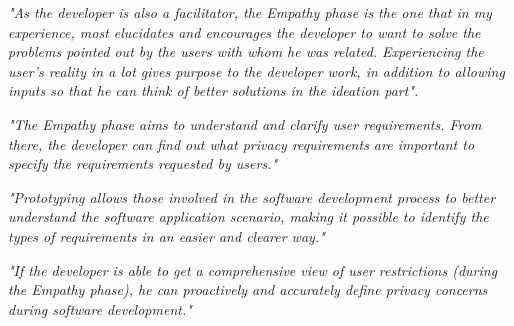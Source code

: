 \documentclass[conference]{IEEEtran}
\begin{document}
\begin{mq}
\emph{"As the developer is also a facilitator, the Empathy phase is the one that in my experience, most elucidates and encourages the developer to want to solve the problems pointed out by the users with whom he was related. Experiencing the user's reality in a lot gives purpose to the developer work, in addition to allowing inputs so that he can think of better solutions in the ideation part".}
\end{mq}

\begin{mq}
\emph{"The Empathy phase aims to understand and clarify user requirements. From there, the developer can find out what privacy requirements are important to specify the requirements requested by users."}
\end{mq}

\begin{mq}
\emph{"Prototyping allows those involved in the software development process to better understand the software application scenario, making it possible to identify the types of requirements in an easier and clearer way."}
\end{mq}

\begin{mq}
\emph{"If the developer is able to get a comprehensive view of user restrictions (during the Empathy phase), he can proactively and accurately define privacy concerns during software development."}
\end{mq}
\end{document}
